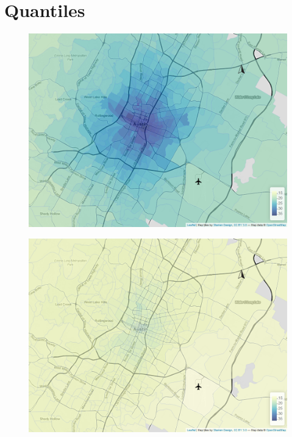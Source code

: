 \section{Quantiles}
\label{appendix:quantiles}


\begin{figure}[htb]
    \centering
    \begin{minipage}[t]{0.48\linewidth}
        \centering
        \includegraphics[width=\linewidth]{img/quantile_9_25.png}
        \label{fig:quantiles:0.25:a}
    \end{minipage}
    \begin{minipage}[t]{0.48\linewidth}
        \centering
        \includegraphics[width=\linewidth]{img/quantile_43_25.png}

\end{minipage}
\end{figure}
